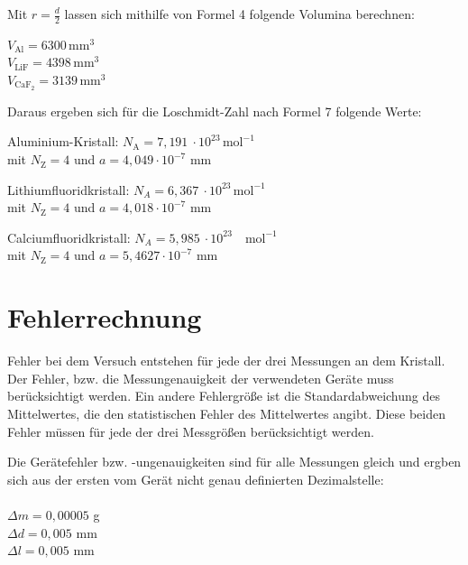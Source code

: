 \documentclass[12pt,a4paper,titlepage,headinclude,bibtotoc]{scrartcl}
\begin{document}
Mit $r=\frac{d}{2}$ lassen sich mithilfe von Formel 4 folgende Volumina berechnen:

\vspace{3mm}
$V_\mathrm{Al} = 6300\,\mathrm{mm^3}$\\
$V_\mathrm{LiF} =4398\,\mathrm{mm^3}$\\
$V_\mathrm{CaF_2} = 3139\,\mathrm{mm^3}$\\

\vspace{3mm}

Daraus ergeben sich für die Loschmidt-Zahl nach Formel 7 folgende Werte:
\vspace{3mm}

Aluminium-Kristall: \qquad $N_\mathrm{A} = 7,191 \ \cdot 10^{23}\, \mathrm{mol^{-1}}$\\
mit $N_\mathrm{Z} =4$ und $a=4,049\cdot 10^{-7} $ mm\\
\vspace{3mm}

Lithiumfluoridkristall: \qquad $N_A = 6,367 \ \cdot 10^{23}\,\mathrm{mol^{-1}}$\\
mit $N_\mathrm{Z} =4$ und $a=4,018\cdot 10^{-7} $ mm\\
\vspace{3mm}

Calciumfluoridkristall: \qquad $N_{A} = 5,985 \ \cdot 10^{23} \quad\mathrm{mol^{-1}}$\\
mit $N_\mathrm{Z} =4$ und $a=5,4627\cdot 10^{-7} $ mm\\
\vspace{3mm}


\section{Fehlerrechnung}
Fehler bei dem Versuch entstehen für jede der drei Messungen an dem Kristall. Der Fehler, bzw. die Messungenauigkeit der verwendeten Geräte muss berücksichtigt werden. Ein andere Fehlergröße ist die Standardabweichung des Mittelwertes, die den statistischen Fehler des Mittelwertes angibt. 
Diese beiden Fehler müssen für jede der drei Messgrößen berücksichtigt werden.

Die Gerätefehler bzw. -ungenauigkeiten sind für alle Messungen gleich und ergben sich aus der ersten vom Gerät nicht genau definierten Dezimalstelle:
\\
\\
$\Delta m = 0,00005$ g \\
$\Delta d = 0,005$ mm\\
$\Delta l = 0,005 $ mm\\
\\
\end{document}
